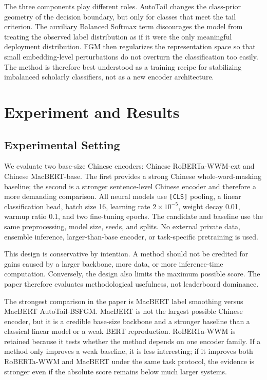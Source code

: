 \documentclass[10pt]{article}
\begin{document}
The three components play different roles. AutoTail changes the class-prior geometry of the decision boundary, but only for classes that meet the tail criterion. The auxiliary Balanced Softmax term discourages the model from treating the observed label distribution as if it were the only meaningful deployment distribution. FGM then regularizes the representation space so that small embedding-level perturbations do not overturn the classification too easily. The method is therefore best understood as a training recipe for stabilizing imbalanced scholarly classifiers, not as a new encoder architecture.

\section{Experiment and Results}

\subsection{Experimental Setting}

We evaluate two base-size Chinese encoders: Chinese RoBERTa-WWM-ext and Chinese MacBERT-base. The first provides a strong Chinese whole-word-masking baseline; the second is a stronger sentence-level Chinese encoder and therefore a more demanding comparison. All neural models use \texttt{[CLS]} pooling, a linear classification head, batch size 16, learning rate $2\times10^{-5}$, weight decay 0.01, warmup ratio 0.1, and two fine-tuning epochs. The candidate and baseline use the same preprocessing, model size, seeds, and splits. No external private data, ensemble inference, larger-than-base encoder, or task-specific pretraining is used.

This design is conservative by intention. A method should not be credited for gains caused by a larger backbone, more data, or more inference-time computation. Conversely, the design also limits the maximum possible score. The paper therefore evaluates methodological usefulness, not leaderboard dominance.

The strongest comparison in the paper is MacBERT label smoothing versus MacBERT AutoTail-BSFGM. MacBERT is not the largest possible Chinese encoder, but it is a credible base-size backbone and a stronger baseline than a classical linear model or a weak BERT reproduction. RoBERTa-WWM is retained because it tests whether the method depends on one encoder family. If a method only improves a weak baseline, it is less interesting; if it improves both RoBERTa-WWM and MacBERT under the same task protocol, the evidence is stronger even if the absolute score remains below much larger systems.
\end{document}
